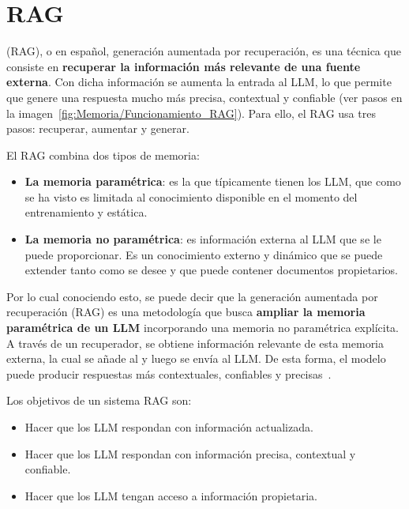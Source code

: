 \section{RAG}
 (RAG), o en español, generación aumentada por recuperación, es una técnica que consiste en \textbf{recuperar la información más relevante de una fuente externa}. Con dicha información se aumenta la entrada al LLM, lo que permite que genere una respuesta mucho más precisa, contextual y confiable (ver pasos en la imagen~\ref{fig:Memoria/Funcionamiento_RAG}). Para ello, el RAG usa tres pasos: recuperar, aumentar y generar. 


El RAG combina dos tipos de memoria:
\begin{itemize}
\tightlist
	\item \textbf{La memoria paramétrica}: es la que típicamente tienen los LLM, que como se ha visto es limitada al conocimiento disponible en el momento del entrenamiento y estática. 
	\item \textbf{La memoria no paramétrica}: es información externa al LLM que se le puede proporcionar. Es un conocimiento externo y dinámico que se puede extender tanto como se desee y que puede contener documentos propietarios.
\end{itemize}

Por lo cual conociendo esto, se puede decir que la generación aumentada por recuperación (RAG) es una metodología que busca \textbf{ampliar la memoria paramétrica de un LLM} incorporando una memoria no paramétrica explícita. A través de un recuperador, se obtiene información relevante de esta memoria externa, la cual se añade al  y luego se envía al LLM. De esta forma, el modelo puede producir respuestas más contextuales, confiables y precisas~\cite{book:RAG_SimpleGuide}.

Los objetivos de un sistema RAG son:
\begin{itemize}
\tightlist
	\item Hacer que los LLM respondan con información actualizada.
	\item Hacer que los LLM respondan con información precisa, contextual y confiable.
	\item Hacer que los LLM tengan acceso a información propietaria.
\end{itemize}

